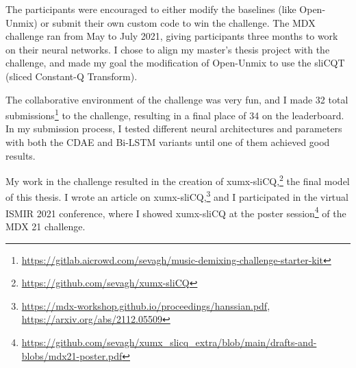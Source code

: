 \documentclass[report.tex]{subfiles}
\begin{document}
\begin{appendices}
The participants were encouraged to either modify the baselines (like Open-Unmix) or submit their own custom code to win the challenge. The MDX challenge ran from May to July 2021, giving participants three months to work on their neural networks. I chose to align my master's thesis project with the challenge, and made my goal the modification of Open-Unmix to use the sliCQT (sliced Constant-Q Transform).

The collaborative environment of the challenge was very fun, and I made 32 total submissions\footnote{\url{https://gitlab.aicrowd.com/sevagh/music-demixing-challenge-starter-kit}} to the challenge, resulting in a final place of 34 on the leaderboard. In my submission process, I tested different neural architectures and parameters with both the CDAE and Bi-LSTM variants until one of them achieved good results.

My work in the challenge resulted in the creation of xumx-sliCQ,\footnote{\url{https://github.com/sevagh/xumx-sliCQ}} the final model of this thesis. I wrote an article on xumx-sliCQ,\footnote{\url{https://mdx-workshop.github.io/proceedings/hanssian.pdf}, \url{https://arxiv.org/abs/2112.05509}} and I participated in the virtual ISMIR 2021 conference, where I showed xumx-sliCQ at the poster session\footnote{\url{https://github.com/sevagh/xumx_slicq_extra/blob/main/drafts-and-blobs/mdx21-poster.pdf}} of the MDX 21 challenge.

\end{appendices}
\end{document}
